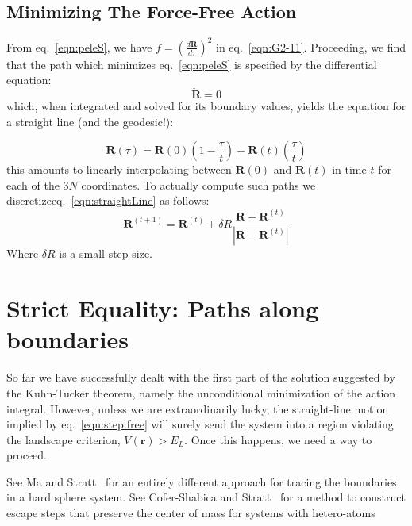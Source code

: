 \documentclass[letterpaper]{tufte-handout}
\newcommand{\laeq}[1]{\label{eqn:#1}}
\renewcommand{\refeq}[1]{eq.~\ref{eqn:#1}}
\renewcommand{\vec}[1]{\mathbf{#1}}
\newcommand{\cvec}[1]{\vec{#1}}
\renewcommand{\refeq}[1]{eq.~\ref{eqn:#1}}
\begin{document}
\subsection{Minimizing The Force-Free Action}
From \refeq{peleS}, we have $f={\left(\frac{d\vec{R}}{d\tau} \right)}^{2}$ in \refeq{G2-11}.  Proceeding, we find that the path which minimizes \refeq{peleS} is specified by the differential equation:
\begin{equation}
  \ddot{\vec{R}} = 0
\end{equation}
which, when integrated and solved for its boundary values, yields the equation for a straight line (and the geodesic!):

\begin{equation}\laeq{straightLine}
  \vec{R}(\tau) = \vec{R}(0) \left( 1-\frac{\tau}{t} \right) + \vec{R}(t)\left( \frac{\tau}{t} \right)
\end{equation}
this amounts to linearly interpolating between $\vec{R}(0)$ and $\vec{R}(t)$ in time $t$ for each of the $3N$ coordinates. To actually compute such paths we discretize\sidenote[][]{Consider $\vec{R}(\tau + \Delta) - \vec{R}(\tau)$.}\refeq{straightLine} as follows:
\begin{equation}\laeq{step:free}
  \boxed{
    \cvec{R}^{(t+1)} = \cvec{R}^{(t)} + \delta R \frac{\cvec{R} - \cvec{R}^{(t)}}{\left| \cvec{R} - \cvec{R}^{(t)} \right|}
  }
\end{equation}
Where $\delta R$ is a small step-size.

\section{Strict Equality: Paths along boundaries}
So far we have successfully dealt with the first part of the solution suggested by the Kuhn-Tucker theorem, namely the unconditional minimization of the action integral. However, unless we are extraordinarily lucky, the straight-line motion implied by \refeq{step:free} will surely send the system into a region violating the landscape criterion, $V(\cvec{r}) > E_L$. Once this happens, we need a way to proceed.

See Ma and Stratt~\cite[-3\baselineskip]{ma:2015} for an entirely different approach for tracing the boundaries in a hard sphere system. See Cofer-Shabica and Stratt~\cite[-1\baselineskip]{dvcs:2017:jcp} for a method to construct escape steps that preserve the center of mass for systems with hetero-atoms
\end{document}
